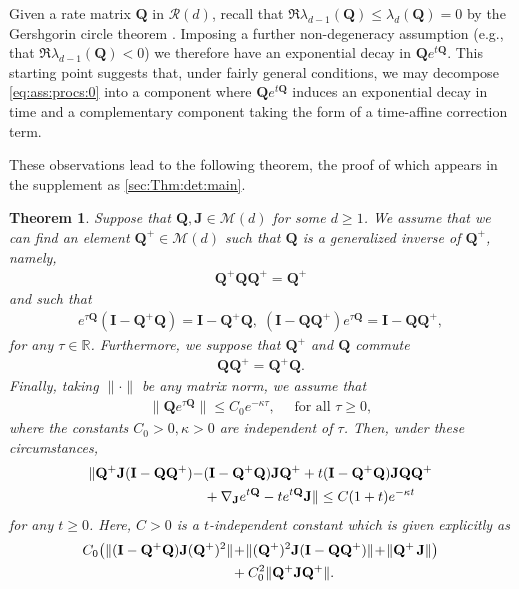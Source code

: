 \documentclass[9pt,twocolumn,twoside]{pnas-new}
\newcommand{\bbR}{{\mathbb R}}
\newcommand{\?}{\textbf{?}}
\newcommand{\QQ}{\mathbf{Q}}
\newcommand{\JJ}{\mathbf{J}}
\newcommand{\II}{\mathbf{I}}
\newtheorem{theorem}{\bf Theorem}
\begin{document}
Given a rate matrix $\QQ$ in $\mathcal{R}(d)$, recall that
$\Re \lambda_{d-1}(\QQ) \leq \lambda_{d}(\QQ)= 0$ by
the Gershgorin circle theorem \cite[Theorem
6.1.1]{horn:johnson:2012}.  Imposing a further
non-degeneracy assumption (e.g., that $\Re \lambda_{d-1}(\QQ)< 0$) we
therefore have an exponential decay in $\QQ e^{t\QQ}$.  This starting
point suggests that, under fairly general conditions, we may decompose
\eqref{eq:ass:procs:0} into a component where $\QQ e^{t\QQ}$ induces
an exponential decay in time and a complementary component taking the
form of a time-affine correction term.

These observations lead to the following theorem, the proof of which appears
in the supplement as \cref{sec:Thm:det:main}.
\begin{theorem}\label{thm:ass:error}
  Suppose that $\QQ, \JJ \in \mathcal{M}(d)$ for some $d \geq 1$.  We
  assume that we can find an element $\QQ^+ \in \mathcal{M}(d)$ such that
  $\QQ$ is a generalized inverse of $\QQ^+$, namely,
  \begin{align}\label{eq:GI:prop}
    \QQ^+ \QQ \QQ^+ = \QQ^+
  \end{align}
  and such that
  \begin{align}\label{eq:MP:proj:prop}
    e^{\tau \QQ}(\II - \QQ^+ \QQ) \!=\!  \II - \QQ^+ \QQ, \;
    (\II - \QQ \QQ^+)e^{\tau \QQ} \!=\!  \II - \QQ \QQ^+,
  \end{align}
  for any $\tau \in \bbR$. Furthermore, we suppose that $\QQ^+$ and
  $\QQ$ commute
  \begin{align}\label{eq:GI:com}
    \QQ \QQ^+ = \QQ^+ \QQ.
  \end{align}
  Finally, taking $\|\cdot\|$ be any matrix norm, we assume that
  \begin{align}\label{eq:qetq:exp:decay}
    \| \QQ e^{\tau \QQ}\| \leq C_0 e^{-\kappa \tau},
    \quad
    \text{ for all } \tau \geq 0,
  \end{align}
  where the constants $C_0 > 0, \kappa > 0$
  are independent of $\tau$.  Then, under these circumstances, 
  \begin{align}\label{eq:ass:error}
    \|\QQ^+ \JJ (\II - \QQ \QQ^{+})-& (\II -\QQ^+ \QQ) \JJ \QQ^{+}
        +t(\II -\QQ^+ \QQ) \JJ \QQ \QQ^{+}
                \notag\\
      &
        +  \nabla_\JJ e^{t \QQ} - t  e^{t\QQ} \JJ\| \leq C(1+ t)e^{-\kappa t}
\end{align}
for any $t \geq 0$.  Here, $C > 0$ is a $t$-independent
constant which is given explicitly as
\begin{align}
  C_0 \big(\| (\II -\QQ^+ \QQ) \JJ (\QQ^{+})^2\|
  \!&+\! \|(\QQ^+)^2\JJ (\II - \QQ \QQ^{+})\|
    \!+\! \|\QQ^+ \hspace{0.5mm}\JJ\|\big)
    \notag\\
    &+ C_0^2 \| \QQ^+  \JJ  \QQ^{+} \|.
      \label{eq:exp:error:ass:er}
  \end{align}
\end{theorem}
\end{document}

